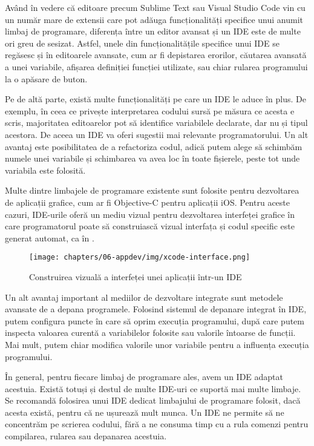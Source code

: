Având în vedere că editoare precum Sublime Text sau Visual Studio Code vin cu un număr mare de extensii care pot adăuga funcționalități specifice unui anumit limbaj de programare, diferența între un editor avansat și un IDE este de multe ori greu de sesizat.
Astfel, unele din funcționalitățile specifice unui IDE se regăsesc și în editoarele avansate, cum ar fi depistarea erorilor, căutarea avansată a unei variabile, afișarea definiției funcției utilizate, sau chiar rularea programului la o apăsare de buton.

Pe de altă parte, există multe funcționalități pe care un IDE le aduce în plus.
De exemplu, în ceea ce privește interpretarea codului sursă pe măsura ce acesta e scris, majoritatea editoarelor pot să identifice variabilele declarate, dar nu și tipul acestora.
De aceea un IDE va oferi sugestii mai relevante programatorului.
Un alt avantaj este posibilitatea de a refactoriza codul, adică putem alege să schimbăm numele unei variabile și schimbarea va avea loc în toate fișierele, peste tot unde variabila este folosită.

Multe dintre limbajele de programare existente sunt folosite pentru dezvoltarea de aplicații grafice, cum ar fi Objective-C pentru aplicații iOS.
Pentru aceste cazuri, IDE-urile oferă un mediu vizual pentru dezvoltarea interfeței grafice în care programatorul poate să construiască vizual interfața și codul specific este generat automat, ca în .

\begin{figure}[!htbp]
  \centering
  \texttt{[image: chapters/06-appdev/img/xcode-interface.png]}
  \caption{Construirea vizuală a interfeței unei aplicații într-un IDE}
  \label{fig:appdev:gui-interface}
\end{figure}

Un alt avantaj important al mediilor de dezvoltare integrate sunt metodele avansate de a depana programele.
Folosind sistemul de depanare integrat în IDE, putem configura puncte în care să oprim execuția programului, după care putem inspecta valoarea curentă a variabilelor folosite sau valorile întoarse de funcții.
Mai mult, putem chiar modifica valorile unor variabile pentru a influența execuția programului.

În general, pentru fiecare limbaj de programare ales, avem un IDE adaptat acestuia.
Există totuși și destul de multe IDE-uri ce suportă mai multe limbaje.
Se recomandă folosirea unui IDE dedicat limbajului de programare folosit, dacă acesta există, pentru că ne ușurează mult munca.
Un IDE ne permite să ne concentrăm pe scrierea codului, fără a ne consuma timp cu a rula comenzi pentru compilarea, rularea sau depanarea acestuia.


